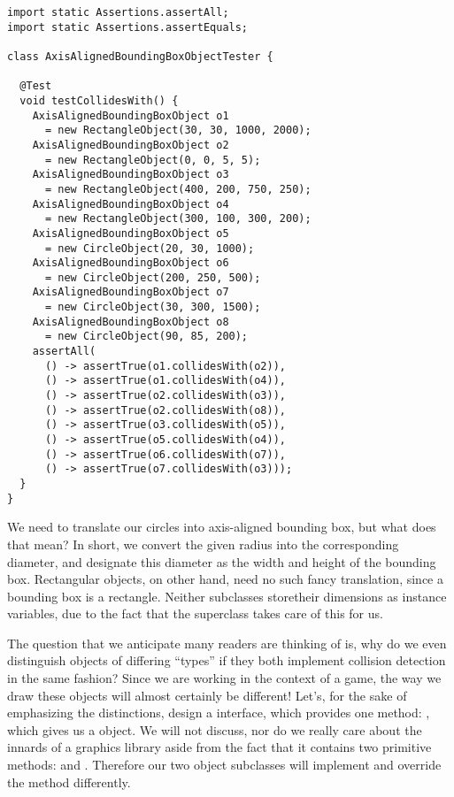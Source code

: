 \begin{lstlisting}[language=MyJava]
import static Assertions.assertAll;
import static Assertions.assertEquals;

class AxisAlignedBoundingBoxObjectTester {

  @Test
  void testCollidesWith() {
    AxisAlignedBoundingBoxObject o1 
      = new RectangleObject(30, 30, 1000, 2000);
    AxisAlignedBoundingBoxObject o2 
      = new RectangleObject(0, 0, 5, 5);
    AxisAlignedBoundingBoxObject o3 
      = new RectangleObject(400, 200, 750, 250);
    AxisAlignedBoundingBoxObject o4 
      = new RectangleObject(300, 100, 300, 200);
    AxisAlignedBoundingBoxObject o5 
      = new CircleObject(20, 30, 1000);
    AxisAlignedBoundingBoxObject o6 
      = new CircleObject(200, 250, 500);
    AxisAlignedBoundingBoxObject o7 
      = new CircleObject(30, 300, 1500);
    AxisAlignedBoundingBoxObject o8 
      = new CircleObject(90, 85, 200);
    assertAll(
      () -> assertTrue(o1.collidesWith(o2)),
      () -> assertTrue(o1.collidesWith(o4)),
      () -> assertTrue(o2.collidesWith(o3)),
      () -> assertTrue(o2.collidesWith(o8)),
      () -> assertTrue(o3.collidesWith(o5)),
      () -> assertTrue(o5.collidesWith(o4)),
      () -> assertTrue(o6.collidesWith(o7)),
      () -> assertTrue(o7.collidesWith(o3)));
  }
}
\end{lstlisting}

We need to translate our circles into axis-aligned bounding box, but what does that mean? In short, we convert the given radius into the corresponding diameter, and designate this diameter as the width and height of the bounding box. Rectangular objects, on other hand, need no such fancy translation, since a bounding box is a rectangle. Neither subclasses storetheir dimensions as instance variables, due to the fact that the superclass takes care of this for us.

The question that we anticipate many readers are thinking of is, why do we even distinguish objects of differing ``types'' if they both implement collision detection in the same fashion? Since we are working in the context of a game, the way we draw these objects will almost certainly be different! Let's, for the sake of emphasizing the distinctions, design a  interface, which provides one method: , which gives us a  object. We will not discuss, nor do we really care about the innards of a graphics library aside from the fact that it contains two primitive methods:  and . Therefore our two object subclasses will implement  and override the method differently.


